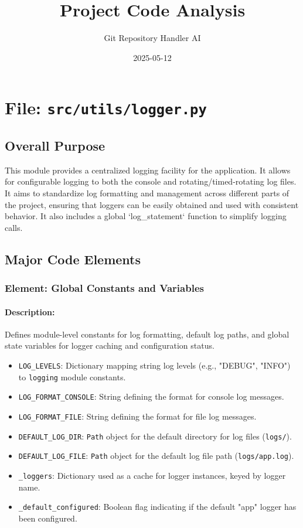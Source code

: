 \documentclass{article}
\title{Project Code Analysis}
\author{Git Repository Handler AI}
\date{2025-05-12} %
\begin{document}
\maketitle
\tableofcontents
\newpage

\section{File: \texttt{src/utils/logger.py}}
\subsection{Overall Purpose}
This module provides a centralized logging facility for the application. It allows for configurable logging to both the console and rotating/timed-rotating log files. It aims to standardize log formatting and management across different parts of the project, ensuring that loggers can be easily obtained and used with consistent behavior. It also includes a global `log_statement` function to simplify logging calls.


\subsection{Major Code Elements}


\subsubsection{Element: Global Constants and Variables}
\paragraph{Description:} Defines module-level constants for log formatting, default log paths, and global state variables for logger caching and configuration status.
\begin{itemize}
    \item \texttt{LOG\_LEVELS}: Dictionary mapping string log levels (e.g., "DEBUG", "INFO") to \texttt{logging} module constants.
    \item \texttt{LOG\_FORMAT\_CONSOLE}: String defining the format for console log messages.
    \item \texttt{LOG\_FORMAT\_FILE}: String defining the format for file log messages.
    \item \texttt{DEFAULT\_LOG\_DIR}: \texttt{Path} object for the default directory for log files (\texttt{logs/}).
    \item \texttt{DEFAULT\_LOG\_FILE}: \texttt{Path} object for the default log file path (\texttt{logs/app.log}).
    \item \texttt{\_loggers}: Dictionary used as a cache for logger instances, keyed by logger name.
    \item \texttt{\_default\_configured}: Boolean flag indicating if the default "app" logger has been configured.
\end{itemize}
\end{document}
